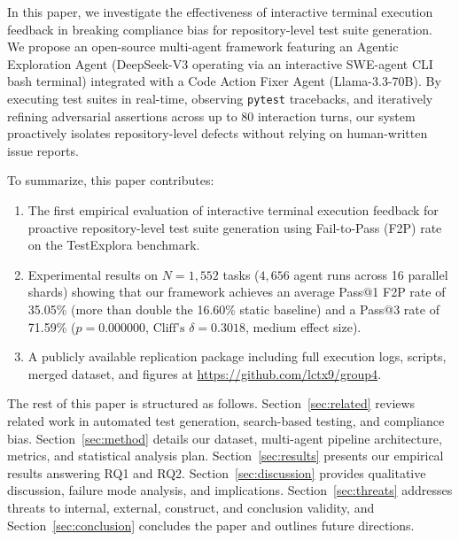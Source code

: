 In this paper, we investigate the effectiveness of interactive terminal execution feedback in breaking compliance bias for repository-level test suite generation. We propose an open-source multi-agent framework featuring an Agentic Exploration Agent (DeepSeek-V3 operating via an interactive SWE-agent CLI bash terminal) integrated with a Code Action Fixer Agent (Llama-3.3-70B). By executing test suites in real-time, observing \texttt{pytest} tracebacks, and iteratively refining adversarial assertions across up to 80 interaction turns, our system proactively isolates repository-level defects without relying on human-written issue reports.

To summarize, this paper contributes:
\begin{enumerate}
    \item The first empirical evaluation of interactive terminal execution feedback for proactive repository-level test suite generation using Fail-to-Pass (F2P) rate on the TestExplora benchmark.
    \item Experimental results on $N=1,552$ tasks ($4,656$ agent runs across 16 parallel shards) showing that our framework achieves an average Pass@1 F2P rate of 35.05\% (more than double the 16.60\% static baseline) and a Pass@3 rate of 71.59\% ($p = 0.000000$, $\text{Cliff's } \delta = 0.3018$, medium effect size).
    \item A publicly available replication package including full execution logs, scripts, merged dataset, and figures at \url{https://github.com/lctx9/group4}.
\end{enumerate}

The rest of this paper is structured as follows. Section~\ref{sec:related} reviews related work in automated test generation, search-based testing, and compliance bias. Section~\ref{sec:method} details our dataset, multi-agent pipeline architecture, metrics, and statistical analysis plan. Section~\ref{sec:results} presents our empirical results answering RQ1 and RQ2. Section~\ref{sec:discussion} provides qualitative discussion, failure mode analysis, and implications. Section~\ref{sec:threats} addresses threats to internal, external, construct, and conclusion validity, and Section~\ref{sec:conclusion} concludes the paper and outlines future directions.
